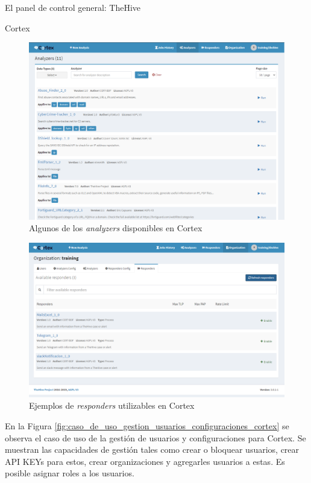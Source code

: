 \begin{section}{El panel de control general: TheHive }
\begin{subsection}{Cortex}
     \begin{figure}[H]
        \centering
        \includegraphics[width=1\textwidth]{./descripcion_sonion_imagenes/figura_26_analyzers_disponibles.png}
        \caption{Algunos de los \textit{analyzers} disponibles en Cortex}
        \label{fig:analizers_disponibles}
     \end{figure}
     \begin{figure}[H]
        \centering
        \includegraphics[width=1\textwidth]{./descripcion_sonion_imagenes/figura_27_responders_cortex.png}
        \caption{Ejemplos de \textit{responders} utilizables en Cortex}
        \label{fig:ejemplos_responders_cortex}
     \end{figure}  
     \FloatBarrier
     En la Figura \ref{fig:caso_de_uso_gestion_usuarios_configuraciones_cortex} se observa el caso de uso de la gestión de usuarios y configuraciones para Cortex. Se muestran las capacidades de gestión tales como crear o bloquear usuarios, crear API KEYs para estos, crear organizaciones y agregarles usuarios a estas. Es posible asignar roles a los usuarios.

\end{subsection}
\end{section}
